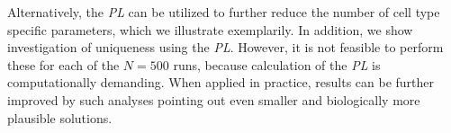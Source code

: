\documentclass{bioinfo}
\begin{document}
\begin{methods}
Alternatively, the \emph{PL} can be utilized to further reduce the number of cell type specific parameters, which we illustrate exemplarily.
In addition, we show investigation of uniqueness using the \emph{PL}.
However, it is not feasible to perform these for each of the $N=500$ runs, because calculation of the \emph{PL} is computationally demanding.
When applied in practice, results can be further improved by such analyses pointing out even smaller and biologically more plausible solutions.


%
%
%
%
%
%

\end{methods}
\end{document}
